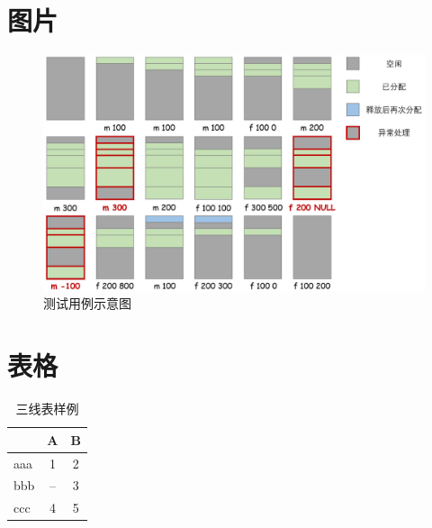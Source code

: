 \documentclass[a4paper,utf8]{ctexart}
\begin{document}
% 

\section{图片}
\begin{figure}[H]
    \centering
    \includegraphics[width=\textwidth]{./img/example.jpg}
    \caption{测试用例示意图}
    \label{fig:example}
\end{figure}

\section{表格}

\begin{table}[ht]
    \centering
    \caption{三线表样例}
    \begin{tabular}[t]{lcc}
    \toprule
    &A&B\\
    \midrule
    aaa&1&2\\
    bbb&--&3\\
    ccc&4&5\\
    \bottomrule
    \end{tabular}
    \label{tab:short}
\end{table}
\end{document}
